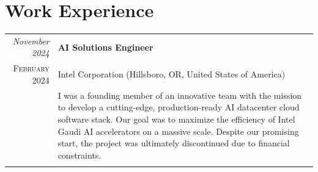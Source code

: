 \documentclass[letter,10pt]{article} %
\begin{document}
\section{Work Experience}
\label{section:work_experience}
\begin{tabular}{r|p{13.4cm}}
	\emph{November 2024} & \textbf{AI Solutions Engineer} \\
	\textsc{February 2024} & Intel Corporation (Hillsboro, OR, United States of America) \\
	& \footnotesize{I was a founding member of an innovative team with the mission to develop a cutting-edge, production-ready AI datacenter cloud software stack. Our goal was to maximize the efficiency of Intel Gaudi AI accelerators on a massive scale. Despite our promising start, the project was ultimately discontinued due to financial constraints.}\\
	\multicolumn{2}{c}{} \\
	

\end{tabular}
\end{document}
